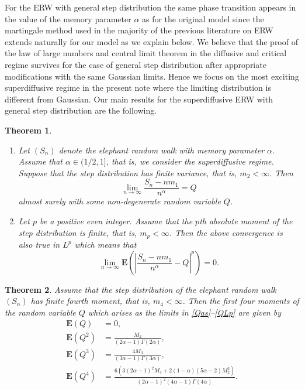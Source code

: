 \documentclass[12pt,a4paper]{article}
\newtheorem{thm}{Theorem}[section]
\newcommand{\E}{\mathbf E}
\numberwithin{equation}{section}
\begin{document}
For the ERW with general step distribution the same phase transition appears in the value of the memory parameter $\alpha$ as for the original model
since the martingale method used in the majority of the previous literature on ERW extends naturally for our model as we explain below.
We believe that the proof of the law of large numbers and central limit theorem in the diffusive and critical regime
survives for the case of general step distribution after appropriate modifications with the same Gaussian limits.
Hence we focus on the most exciting superdiffusive regime in the present note where the limiting distribution is different from Gaussian.
Our main results for the superdiffusive ERW with general step distribution are the following.

\begin{thm}\label{thm:conv}
\begin{enumerate}
\item
Let $(S_n)$ denote the elephant random walk with memory parameter $\alpha$.
Assume that $\alpha\in(1/2,1]$, that is, we consider the superdiffusive regime.
Suppose that the step distribution has finite variance, that is, $m_2<\infty$.
Then
\begin{equation}\label{Qas}
\lim_{n\to\infty}\frac{S_n-nm_1}{n^\alpha}=Q
\end{equation}
almost surely with some non-degenerate random variable $Q$.

\item
Let $p$ be a positive even integer.
Assume that the $p$th absolute moment of the step distribution is finite, that is, $m_p<\infty$.
Then the above convergence is also true in $L^p$ which means that
\begin{equation}\label{QLp}
\lim_{n\to\infty}\E\left(\left|\frac{S_n-nm_1}{n^\alpha}-Q\right|^p\right)=0.
\end{equation}
\end{enumerate}
\end{thm}

\begin{thm}\label{thm:moments}
Assume that the step distribution of the elephant random walk $(S_n)$ has finite fourth moment, that is, $m_4<\infty$.
Then the first four moments of the random variable $Q$ which arises as the limits in \eqref{Qas}--\eqref{QLp} are given by
\begin{align}
\E(Q)&=0,\label{Q1}\\
\E\left(Q^2\right)&=\frac{M_2}{(2\alpha-1)\Gamma(2\alpha)},\label{Q2}\\
\E\left(Q^3\right)&=\frac{4M_3}{(3\alpha-1)\Gamma(3\alpha)},\label{Q3}\\
\E\left(Q^4\right)&=\frac{6(3(2\alpha-1)^2M_4+2(1-\alpha)(5\alpha-2)M_2^2)}{(2\alpha-1)^2(4\alpha-1)\Gamma(4\alpha)}.\label{Q4}
\end{align}
\end{thm}
\end{document}
